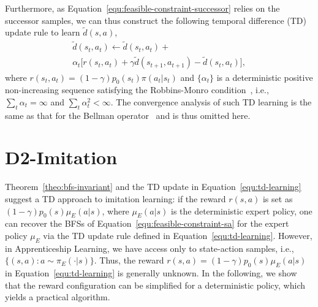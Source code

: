\documentclass[letterpaper]{article} %
\begin{document}
Furthermore, as Equation~\eqref{equ:feasible-constraint-successor} relies on the successor samples, 
we can thus construct the following temporal difference (TD) update rule to learn $\tilde{d}(s, a)$, 
\begin{multline}\label{equ:td-learning}
\tilde{d}(s_t, a_t) \leftarrow \tilde{d}(s_t,a_t) + \\
\alpha_t \big[ r(s_t, a_t) + \gamma \tilde{d}(s_{t+1},a_{t+1}) - \tilde{d}(s_t, a_t) \big], 
\end{multline} 
where $r(s_t, a_t) = (1-\gamma) p_0(s_t)\pi(a_t|s_t)$ 
and $\{\alpha_t\}$ is a deterministic positive non-increasing sequence satisfying the Robbins-Monro condition~\cite{robbins1951stochastic}, 
i.e., $\sum_t\alpha_t = \infty$ and $\sum_t \alpha_t^2 < \infty$. 
The convergence analysis of such TD learning is the same as that for the Bellman operator~\cite{yu2015convergence} and is thus omitted here. 
 

\section{D2-Imitation}
Theorem~\ref{theo:bfs-invariant} and the TD update in Equation~\eqref{equ:td-learning} suggest a TD approach to imitation learning:
if the reward $r(s, a)$ is set as $(1-\gamma)p_0(s)\mu_E(a|s)$, where $\mu_E(a|s)$ is the deterministic expert policy, 
one can recover the BFSs of Equation~\eqref{equ:feasible-constraint-sa} for the expert policy $\mu_E$ via the TD update rule defined in Equation~\eqref{equ:td-learning}. 
However, in Apprenticeship Learning, 
we have access only to state-action samples, 
i.e., $\{(s, a): a\sim\pi_E(\cdot|s)\}$. 
Thus, the reward $r(s, a) = (1-\gamma) p_0(s)\mu_E(a|s)$ in Equation~\eqref{equ:td-learning} is generally unknown. 
In the following, we show that the reward configuration can be simplified for a deterministic policy, which yields a practical algorithm. 
\end{document}
